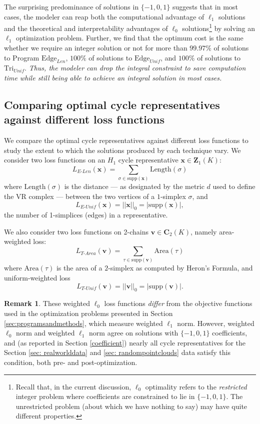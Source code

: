 \documentclass[11pt,onecolumn]{article}
\newcommand{\Chains}{\mathbf{C}}
\newcommand{\Cycles}[0]{\mathbf{Z}}
\newcommand{\optimalrep}{\mathbf{x}}
\newcommand{\se}{Section }
\newcommand{\volvec}{\mathbf{v}}
\newcommand{\supp}{\mathrm{supp}}
\newcommand{\unif}{_{Unif}}
\newcommand{\len}{_{Len}}
\newcommand{\pr}{Program }
\newcommand{\EU}{_{E\text{-}Unif}}
\newcommand{\EL}{_{E\text{-}Len}}
\newcommand{\TU}{_{T\text{-}Unif}}
\newcommand{\TA}{_{T\text{-}Area}}
\newcommand{\Edge}{\mathrm{Edge}}
\newcommand{\Tri}{\mathrm{Tri}}
\theoremstyle{plain}
\theoremstyle{definition}
\newtheorem{remark}[theorem]{Remark}
\begin{document}
The surprising predominance of solutions in $\{-1, 0, 1\}$ suggests that in most cases, the modeler can reap both the computational advantage of $\ell_1$ solutions and the theoretical and interpretability advantages of $\ell_0$  solutions\footnote{Recall that, in the current discussion, $\ell_0$ optimality refers to the \emph{restricted} integer problem where coefficients are constrained to lie in $\{-1,0,1\}$.  The unrestricted problem (about which we have nothing to say) may have quite different properties.} by solving an $\ell_1$ optimization problem. Further, we find that the optimum cost is the same whether we require an integer solution or not for more than $99.97\%$ of solutions to \pr $\Edge\len$, $100\%$ of solutions to $\Edge\unif$, and $100\%$ of solutions to $\Tri\unif$. \emph{Thus, the modeler can drop the integral constraint to save computation time while still being able to achieve an integral solution in most cases.}  

  
\subsection{Comparing optimal cycle representatives against different loss functions}\label{sec:comparing optimal generators against different loss functions}

We compare the optimal cycle representatives against different loss functions to study the extent to which the solutions produced by each technique vary. We consider two loss functions on an $H_1$ cycle representative $\optimalrep \in \Cycles_1(K)$:
$$
L\EL(\optimalrep) = \sum_{\sigma \in \supp(\optimalrep)} \mathrm{Length}(\sigma)
$$
where $\mathrm{Length}(\sigma)$ is the distance --- as designated by the metric $d$ used to define the VR complex --- between the two vertices of a $1$-simplex $\sigma$, and
$$
L\EU(\optimalrep) = ||\optimalrep||_0=|\supp(\optimalrep)|, 
$$ 
the number of 1-simplices (edges) in a representative. 


We also consider two loss functions on 2-chains $\volvec \in \Chains_2(K)$, namely area-weighted loss:
$$
L\TA(\volvec) = \sum_{\tau \in \supp(\volvec)} \mathrm{Area}(\tau)$$
where $\mathrm{Area}(\tau)$ is the area of a $2$-simplex as computed by Heron's Formula, and uniform-weighted loss
$$
L\TU(\volvec) = ||\volvec||_0 = |\supp( \volvec)|.
$$

\begin{remark}
These weighted $\ell_0$ loss functions \emph{differ} from the objective functions used in the optimization problems presented in \se \ref{sec:programsandmethods}, which measure weighted $\ell_1$ norm.  However, weighted $\ell_0$ norm and weighted $\ell_1$ norm agree on solutions with $\{-1, 0, 1\}$ coefficients, and (as reported in \se \ref{coefficient}) nearly all cycle representatives for the \se \ref{sec: realworlddata} and \ref{sec: randompointclouds} data satisfy this condition, both pre- and post-optimization.
\end{remark}
\end{document}

